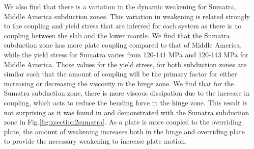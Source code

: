\documentclass[12pt]{article}
\begin{document}
{  We also find that there is a variation in the dynamic weakening for Sumatra, Middle America subduction zones. This variation in weakening is related strongly to the coupling and yield stress that are inferred for each system as there is no coupling between the slab and the lower mantle. We find that the Sumatra subduction zone has more plate coupling compared to that of Middle America, while the yield stress for Sumatra varies from 120-141 MPa and 120-143 MPa for Middle America. Those values for the yield stress, for both subduction zones are similar such that the amount of coupling will be the primary factor for either increasing or decreasing the viscosity in the hinge zone. We find that for the Sumatra subduction zone, there is more viscous dissipation due to the increase in coupling, which acts to reduce the bending force in the hinge zone. This result is not surprising as it was found in \citep{ratnaswamy2015adjoint} and demonstrated with the Sumatra subduction zone in Fig.\ref{fig:xsection2sumatra}. As a plate is more coupled to the overriding plate, the amount of weakening increases both in the hinge and overriding plate to provide the necessary weakening to increase plate motion.
  
}
\end{document}

